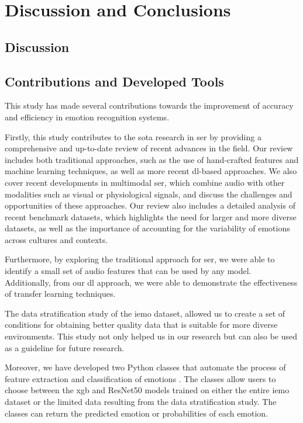 \chapter{Discussion and Conclusions}
\label{chapter:conc}

\section{Discussion}


\section{Contributions and Developed Tools}

This study has made several contributions towards the improvement of accuracy and efficiency in emotion recognition systems.

Firstly, this study contributes to the \ac{sota} research in \ac{ser} by providing a comprehensive and up-to-date review of recent advances in the field. Our review includes both traditional approaches, such as the use of hand-crafted features and machine learning techniques, as well as more recent \ac{dl}-based approaches. We also cover recent developments in multimodal \ac{ser}, which combine audio with other modalities such as visual or physiological signals, and discuss the challenges and opportunities of these approaches. Our review also includes a detailed analysis of recent benchmark datasets, which highlights the need for larger and more diverse datasets, as well as the importance of accounting for the variability of emotions across cultures and contexts.

Furthermore, by exploring the traditional approach for \ac{ser}, we were able to identify a small set of audio features that can be used by any model. Additionally, from our \ac{dl} approach, we were able to demonstrate the effectiveness of transfer learning techniques.

The data stratification study of the \ac{iemo} dataset, allowed us to create a set of conditions for obtaining better quality data that is suitable for more diverse environments. This study not only helped us in our research but can also be used as a guideline for future research.

Moreover, we have developed two Python classes that automate the process of feature extraction and classification of emotions \cite{Mario_Silva_Speech_Emotion_Recognition_2023}. The classes allow users to choose between the \ac{xgb} and ResNet50 models trained on either the entire \ac{iemo} dataset or the limited data resulting from the data stratification study. The classes can return the predicted emotion or probabilities of each emotion.

